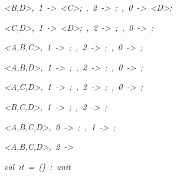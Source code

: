 \begin{list}{}
\item[]\textsl{<B,D>,\ 1\ ->\ <C>;\ <B,D>,\ 2\ ->\ <B,D>;\ <C,D>,\ 0\ ->\ <D>;}
\item[]\textsl{<C,D>,\ 1\ ->\ <D>;\ <C,D>,\ 2\ ->\ <C,D>;\ <A,B,C>,\ 0\ ->\ <A,C,D>;}
\item[]\textsl{<A,B,C>,\ 1\ ->\ <A,B,C,D>;\ <A,B,C>,\ 2\ ->\ <B,C>;\ <A,B,D>,\ 0\ ->\ <A,C>;}
\item[]\textsl{<A,B,D>,\ 1\ ->\ <A,B,C>;\ <A,B,D>,\ 2\ ->\ <B,D>;\ <A,C,D>,\ 0\ ->\ <A,D>;}
\item[]\textsl{<A,C,D>,\ 1\ ->\ <A,B,D>;\ <A,C,D>,\ 2\ ->\ <C,D>;\ <B,C,D>,\ 0\ ->\ <C,D>;}
\item[]\textsl{<B,C,D>,\ 1\ ->\ <C,D>;\ <B,C,D>,\ 2\ ->\ <B,C,D>;}
\item[]\textsl{<A,B,C,D>,\ 0\ ->\ <A,C,D>;\ <A,B,C,D>,\ 1\ ->\ <A,B,C,D>;}
\item[]\textsl{<A,B,C,D>,\ 2\ ->\ <B,C,D>}
\item[]\textsl{val\ it\ =\ ()\ :\ unit}
\end{list}
